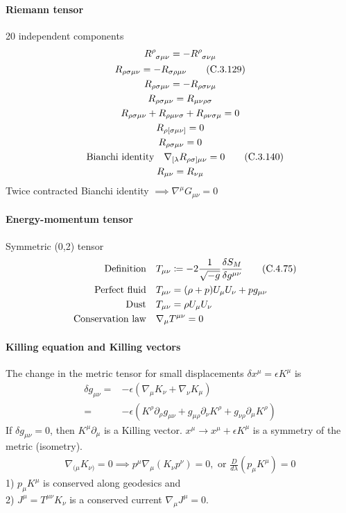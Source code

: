 \documentclass[main]{subfiles}
\begin{document}
\begin{multicols}{2}
\paragraph{Riemann tensor} 20 independent components
\begin{gather}
    R\indices{^\rho_{\sigma\mu\nu}} = - R\indices{^\rho_{\sigma\nu\mu}}
    \\
    R_{\rho\sigma\mu\nu} = - R_{\sigma\rho\mu\nu} \tag{C.3.129}
    \\
    R_{\rho\sigma\mu\nu} = - R_{\rho\sigma\nu\mu}
    \\
    R_{\rho\sigma\mu\nu} = R_{\mu\nu\rho\sigma}
    \\
    R_{\rho\sigma\mu\nu} + R_{\rho\mu\nu\sigma} + R_{\rho\nu\sigma\mu} = 0
    \\
    R_{\rho[\sigma\mu\nu]} = 0
    \\
    R_{\rho\sigma\mu\nu} = 0
    \\
    \qq{Bianchi identity} \nabla_{[\lambda} R_{\rho\sigma]\mu\nu} = 0 \tag{C.3.140}
    \\
    R_{\mu\nu} = R_{\nu\mu}
\end{gather}
Twice contracted Bianchi identity $\implies \nabla^\mu G_{\mu\nu} = 0$

\paragraph{Energy-momentum tensor} Symmetric (0,2) tensor
\begin{align}
    \qq{Definition} & T_{\mu\nu} \coloneq -2 \frac{1}{\sqrt{-g}} \fdv{S_M}{g^{\mu\nu}} \tag{C.4.75}\\
    \qq{Perfect fluid} & T_{\mu\nu} = (\rho + p)U_\mu U_\nu + p g_{\mu \nu}\\
    \qq{Dust} & T_{\mu\nu} = \rho U_\mu U_\nu\\
    \qq{Conservation law} & \nabla_\mu T^{\mu\nu} = 0
\end{align}

\paragraph{Killing equation and Killing vectors} 

The change in the metric tensor for small displacements $\delta x^\mu = \epsilon K^\mu$ is
\begin{align}
    \delta g_{\mu\nu} =& -\epsilon (\nabla_\mu K_\nu + \nabla_\nu K_\mu)
    \\
    =& -\epsilon (K^\rho \partial_\rho g_{\mu\nu} + g_{\mu\rho}\partial_\nu K^\rho + g_{\nu\rho}\partial_\mu K^\rho)
\end{align}
If $\delta g_{\mu\nu} = 0$, then $K^\mu\partial_\mu$ is a Killing vector. $x^\mu \rightarrow x^\mu + \epsilon K^\mu$ is a symmetry of the metric (isometry).
\begin{gather}
    \nabla_{(\mu}K_{\nu)} = 0 \implies p^\mu\nabla_\mu(K_\nu p^\nu) = 0, \text{ or } \frac{D}{d\lambda}(p_\mu K^\mu) = 0
\end{gather}
1) $p_\mu K^\mu$ is conserved along geodesics and \\
2) $J^\mu = T^{\mu\nu}K_\nu$ is a conserved current $\nabla_\mu J^\mu = 0$.


\end{multicols}
\end{document}
